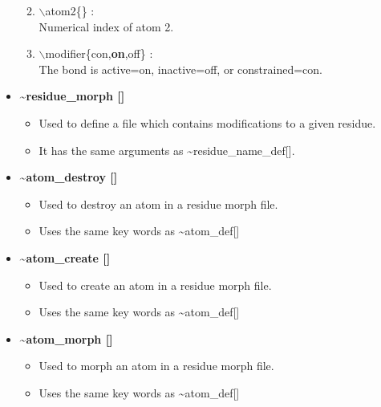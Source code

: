 \documentclass[12pt]{article}
\begin{document}
\begin{itemize}
\begin{enumerate}
 \vspace{0.15in} \Large
 \item  $\backslash$atom2\{\} : \\
   \large
   Numerical index of atom 2.

 \vspace{0.15in} \Large
 \item  $\backslash$modifier\{con,{\bf on},off\} : \\
   \large
   The bond is active=on, inactive=off, or constrained=con.

\end{enumerate}
\clearpage
\huge
\item [] {\bf \~{ }residue\_morph []}
\begin{itemize}
 \large \item Used to define a file which contains modifications to 
              a given residue.
 \large \item It has the same arguments as \~{ }residue\_name\_def[].
\end{itemize}
\huge
\item [] {\bf \~{ }atom\_destroy []}
\begin{itemize}
 \large  \item Used to destroy an atom in a residue morph file.
 \large  \item Uses the same key words as \~{ }atom\_def[]
\end{itemize}
\huge
\item [] {\bf \~{ }atom\_create []}
\begin{itemize}
 \large  \item Used to create an atom in a residue morph file.
 \large  \item Uses the same key words as \~{ }atom\_def[]
\end{itemize}
\huge
\item [] {\bf \~{ }atom\_morph []}
\begin{itemize}
 \large  \item Used to morph an atom in a residue morph file.
 \large  \item Uses the same key words as \~{ }atom\_def[]
\end{itemize}

\end{itemize}
\end{document}
